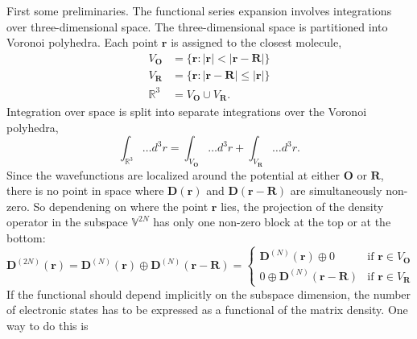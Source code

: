 \documentclass[journal=jpclcd,manuscript=letter]{achemso}
\DeclareMathOperator{\tr}{tr}
\newcommand\m[1]{\mathbf{#1}}
\renewcommand\vec[1]{\mathbf{#1}}
\begin{document}
First some preliminaries.
The functional series expansion involves integrations over three-dimensional space.
The three-dimensional space is partitioned into Voronoi polyhedra. Each point $\vec{r}$ is assigned to the closest molecule,
\begin{align}
  V_{\vec{O}} &= \{\vec{r}: \vert \vec{r} \vert < \vert \vec{r} - \vec{R} \vert \} \\
  V_{\vec{R}} &= \{\vec{r}: \vert \vec{r} - \vec{R} \vert \leq \vert \vec{r} \vert \} \\
  \mathbb{R}^3 &= V_{\vec{O}} \cup V_{\vec{R}}.
\end{align}
Integration over space is split into separate integrations over the Voronoi polyhedra,
\begin{equation}
 \int_{\mathbb{R}^3} \ldots d^3\!r = \int_{V_{\vec{O}}} \ldots d^3\!r + \int_{V_{\vec{R}}} \ldots d^3\!r.
\end{equation}
Since the wavefunctions are localized around the potential at either $\vec{O}$ or $\vec{R}$, there is no point in space where $\m{D}(\vec{r})$ and $\m{D}(\vec{r}-\vec{R})$ are simultaneously non-zero. So dependening on where the point $\vec{r}$ lies, the projection of the density operator in the subspace $\mathbb{V}^{2N}$ has only one non-zero block at the top or at the bottom:
\begin{equation}
  \m{D}^{(2N)}(\vec{r}) = \m{D}^{(N)}(\vec{r}) \oplus \m{D}^{(N)}(\vec{r}-\vec{R}) =
  \begin{cases}
    \m{D}^{(N)}(\vec{r}) \oplus 0 & \text{if } \vec{r} \in V_{\vec{O}} \\
    0 \oplus \m{D}^{(N)}(\vec{r}-\vec{R}) & \text{if } \vec{r} \in V_{\vec{R}} \label{eqn:D_split}
  \end{cases}
\end{equation}
If the functional should depend implicitly on the subspace dimension, the number of electronic states has to be expressed as a functional of the matrix density. One way to do this is
\end{document}
